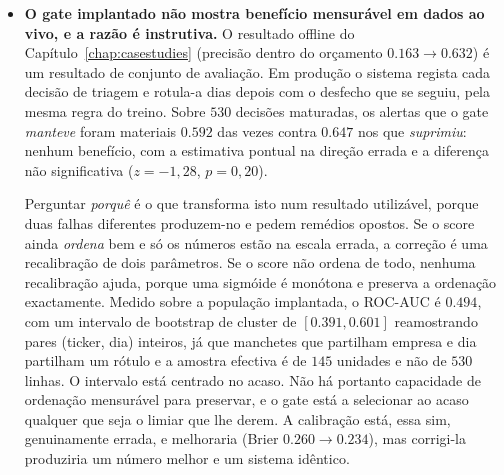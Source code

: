 \begin{itemize}
        de ter tendência (Secção~\ref{sec:cs_drift}). Os valores reportados devem portanto ler-se como
        medições sob uma dessas oscilações, e não como promessas sobre um período posterior.
  \item \textbf{O gate implantado não mostra benefício mensurável em dados ao vivo, e a razão é
        instrutiva.} O resultado offline do Capítulo~\ref{chap:casestudies} (precisão dentro do
        orçamento $0.163 \to 0.632$) é um resultado de conjunto de avaliação. Em produção o sistema
        regista cada decisão de triagem e rotula-a dias depois com o desfecho que se seguiu, pela
        mesma regra do treino. Sobre $530$ decisões maturadas, os alertas que o gate \emph{manteve}
        foram materiais $0.592$ das vezes contra $0.647$ nos que \emph{suprimiu}: nenhum benefício,
        com a estimativa pontual na direção errada e a diferença não significativa
        ($z = -1{,}28$, $p = 0{,}20$).

        Perguntar \emph{porquê} é o que transforma isto num resultado utilizável, porque duas
        falhas diferentes produzem-no e pedem remédios opostos. Se o score ainda \emph{ordena} bem e
        só os números estão na escala errada, a correção é uma recalibração de dois parâmetros. Se o
        score não ordena de todo, nenhuma recalibração ajuda, porque uma sigmóide é monótona e
        preserva a ordenação exactamente. Medido sobre a população implantada, o ROC-AUC é $0.494$,
        com um intervalo de bootstrap de cluster de $[0.391, 0.601]$ reamostrando pares
        (ticker, dia) inteiros, já que manchetes que partilham empresa e dia partilham um rótulo e a
        amostra efectiva é de $145$ unidades e não de $530$ linhas. O intervalo está centrado no
        acaso. Não há portanto capacidade de ordenação mensurável para preservar, e o gate está a
        selecionar ao acaso qualquer que seja o limiar que lhe derem. A calibração está, essa sim,
        genuinamente errada, e melhoraria (Brier $0.260 \to 0.234$), mas corrigi-la produziria um
        número melhor e um sistema idêntico.


\end{itemize}
